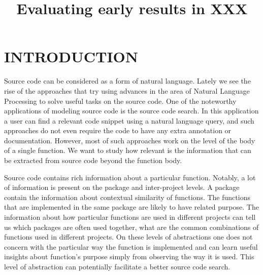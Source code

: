 \documentclass[a4paper,twoside]{article}
\begin{document}
\title{Evaluating early results in XXX}

\author{
}

\keywords{}


\onecolumn \maketitle \normalsize \setcounter{footnote}{0} \vfill

\section{\uppercase{Introduction}}
Source code can be considered as a form of natural language. Lately we see the rise of the approaches that try using advances in the area of Natural Language Processing to solve useful tasks on the source code. One of the noteworthy applications of modeling source code is the source code search. In this application a user can find a relevant code snippet using a natural language query, and such approaches do not even require the code to have any extra annotation or documentation. However, most of such approaches work on the level of the body of a single function. We want to study how relevant is the information that can be extracted from source code beyond the function body. 
 
Source code contains rich information about a particular function. Notably, a lot of information is present on the package and inter-project levels. A package contain the information about contextual similarity of functions. The functions that are implemented in the same package are likely to have related purpose. The information about how particular functions are used in different projects can tell us which packages are often used together, what are the common combinations of functions used in different projects. On these levels of abstractions one does not concern with the particular way the function is implemented and can learn useful insights about function's purpose simply from observing the way it is used. This level of abstraction can potentially facilitate a better source code search. 
\end{document}
